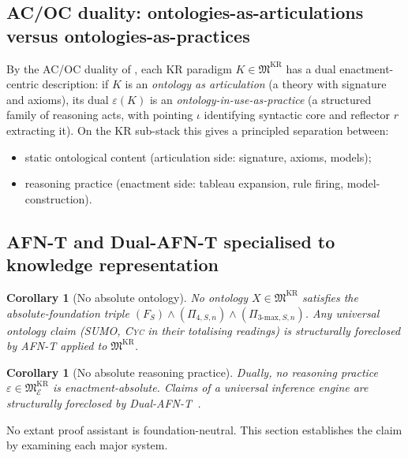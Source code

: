\documentclass[11pt, a4paper]{article}
\newtheorem{corollary}[theorem]{Corollary}
\theoremstyle{definition}
\theoremstyle{remark}
\newcommand{\fM}{\mathfrak{M}}
\newcommand{\cE}{\mathcal{E}}
\newcommand{\SUMO}{\textsc{SUMO}}
\newcommand{\Cyc}{\textsc{Cyc}}
\begin{document}
\subsection{AC/OC duality: ontologies-as-articulations versus ontologies-as-practices}
\label{subsec:kr-ac-oc}

By the AC/OC duality of \cite[\S ac-oc-duality]{Sereda2026MSFS}, each KR paradigm $K \in \fM^{\mathrm{KR}}$ has a dual enactment-centric description: if $K$ is an \emph{ontology as articulation} (a theory with signature and axioms), its dual $\varepsilon(K)$ is an \emph{ontology-in-use-as-practice} (a structured family of reasoning acts, with pointing $\iota$ identifying syntactic core and reflector $r$ extracting it). On the KR sub-stack this gives a principled separation between:
\begin{itemize}[nosep]
\item static ontological content (articulation side: signature, axioms, models);
\item reasoning practice (enactment side: tableau expansion, rule firing, model-construction).
\end{itemize}

\subsection{AFN-T and Dual-AFN-T specialised to knowledge representation}
\label{subsec:kr-afnt-consequence}

\begin{corollary}[No absolute ontology]
\label{cor:kr-afnt}
No ontology $X \in \fM^{\mathrm{KR}}$ satisfies the absolute-foundation triple $(F_S) \wedge (\Pi_{4,S,n}) \wedge (\Pi_{3\text{-max},S,n})$. Any \emph{universal ontology} claim (\SUMO, \Cyc{} in their totalising readings) is structurally foreclosed by AFN-T applied to $\fM^{\mathrm{KR}}$.
\end{corollary}

\begin{corollary}[No absolute reasoning practice]
\label{cor:kr-dual-afnt}
Dually, no reasoning practice $\varepsilon \in \fM^{\mathrm{KR}}_{\cE}$ is enactment-absolute. Claims of a \emph{universal inference engine} are structurally foreclosed by Dual-AFN-T~\cite[\S ac-oc-duality]{Sereda2026MSFS}.
\end{corollary}

No extant proof assistant is foundation-neutral. This section establishes the claim by examining each major system.
\end{document}
